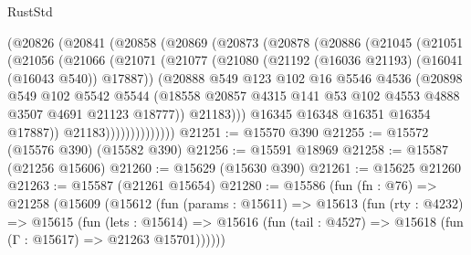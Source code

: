 \begin{lexlean}{RustStd}
\begin{coremodule}
              (@20826
                (@20841
                  (@20858
                    (@20869
                      (@20873
                        (@20878
                          (@20886
                            (@21045
                              (@21051
                                (@21056
                                  (@21066
                                    (@21071
                                      (@21077
                                        (@21080
                                          (@21192 (@16036 @21193) (@16041 (@16043 @540)) @17887))
                                        (@20888
                                          @549
                                          @123
                                          @102
                                          @16
                                          @5546
                                          @4536
                                          (@20898
                                            @549
                                            @102
                                            @5542
                                            @5544
                                            (@18558
                                              @20857
                                              @4315
                                              @141
                                              @53
                                              @102
                                              @4553
                                              @4888
                                              @3507
                                              @4691
                                              @21123
                                              @18777))
                                          @21183)))
                                    @16345
                                    @16348
                                    @16351
                                    @16354
                                    @17887))
                                @21183))))))))))))))
@21251 := @15570 @390
@21255 := @15572 (@15576 @390) (@15582 @390)
@21256 := @15591 @18969
@21258 := @15587 (@21256 @15606)
@21260 := @15629 (@15630 @390)
@21261 := @15625 @21260
@21263 := @15587 (@21261 @15654)
@21280 := @15586
    (fun (fn : @76) =>
    @21258
      (@15609
        (@15612
          (fun (params : @15611) =>
          @15613
            (fun (rty : @4232) =>
            @15615
              (fun (lets : @15614) =>
              @15616 (fun (tail : @4527) => @15618 (fun (Γ : @15617) => @21263 @15701))))))

\end{coremodule}
\end{lexlean}
